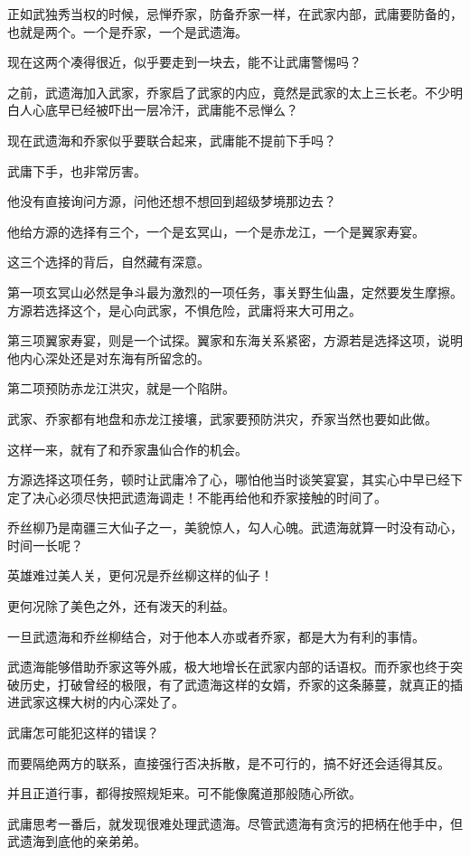 \begin{this_body}
正如武独秀当权的时候，忌惮乔家，防备乔家一样，在武家内部，武庸要防备的，也就是两个。一个是乔家，一个是武遗海。

现在这两个凑得很近，似乎要走到一块去，能不让武庸警惕吗？

之前，武遗海加入武家，乔家启了武家的内应，竟然是武家的太上三长老。不少明白人心底早已经被吓出一层冷汗，武庸能不忌惮么？

现在武遗海和乔家似乎要联合起来，武庸能不提前下手吗？

武庸下手，也非常厉害。

他没有直接询问方源，问他还想不想回到超级梦境那边去？

他给方源的选择有三个，一个是玄冥山，一个是赤龙江，一个是翼家寿宴。

这三个选择的背后，自然藏有深意。

第一项玄冥山必然是争斗最为激烈的一项任务，事关野生仙蛊，定然要发生摩擦。方源若选择这个，是心向武家，不惧危险，武庸将来大可用之。

第三项翼家寿宴，则是一个试探。翼家和东海关系紧密，方源若是选择这项，说明他内心深处还是对东海有所留念的。

第二项预防赤龙江洪灾，就是一个陷阱。

武家、乔家都有地盘和赤龙江接壤，武家要预防洪灾，乔家当然也要如此做。

这样一来，就有了和乔家蛊仙合作的机会。

方源选择这项任务，顿时让武庸冷了心，哪怕他当时谈笑宴宴，其实心中早已经下定了决心必须尽快把武遗海调走！不能再给他和乔家接触的时间了。

乔丝柳乃是南疆三大仙子之一，美貌惊人，勾人心魄。武遗海就算一时没有动心，时间一长呢？

英雄难过美人关，更何况是乔丝柳这样的仙子！

更何况除了美色之外，还有泼天的利益。

一旦武遗海和乔丝柳结合，对于他本人亦或者乔家，都是大为有利的事情。

武遗海能够借助乔家这等外戚，极大地增长在武家内部的话语权。而乔家也终于突破历史，打破曾经的极限，有了武遗海这样的女婿，乔家的这条藤蔓，就真正的插进武家这棵大树的内心深处了。

武庸怎可能犯这样的错误？

而要隔绝两方的联系，直接强行否决拆散，是不可行的，搞不好还会适得其反。

并且正道行事，都得按照规矩来。可不能像魔道那般随心所欲。

武庸思考一番后，就发现很难处理武遗海。尽管武遗海有贪污的把柄在他手中，但武遗海到底他的亲弟弟。


\end{this_body}

